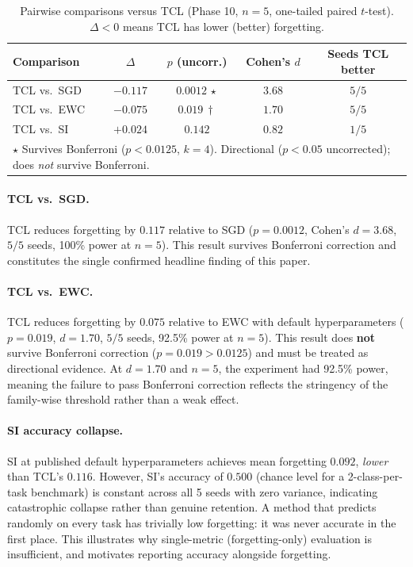 \documentclass[10pt,letterpaper]{article}
\newcommand{\TCL}{\textsc{TCL}}
\newcommand{\EWC}{\textsc{EWC}}
\newcommand{\SI}{\textsc{SI}}
\newcommand{\SGD}{\textsc{SGD}}
\begin{document}
\begin{table}[t]
  \caption{%
    Pairwise comparisons versus \TCL{} (Phase 10, $n{=}5$, one-tailed paired $t$-test).
    $\Delta < 0$ means \TCL{} has lower (better) forgetting.
  }
  \label{tab:phase10_pairwise}
  \centering
  \small
  \begin{tabular}{lcccc}
    \toprule
    Comparison & $\Delta$ & $p$ (uncorr.) & Cohen's $d$ & Seeds \TCL{} better \\
    \midrule
    \TCL{} vs.\ \SGD{}  & $-0.117$ & $0.0012\,\star$ & $3.68$ & $5/5$ \\
    \TCL{} vs.\ \EWC{}  & $-0.075$ & $0.019\,\dag$  & $1.70$ & $5/5$ \\
    \TCL{} vs.\ \SI{}   & $+0.024$ & $0.142$        & $0.82$ & $1/5$ \\
    \bottomrule
    \multicolumn{5}{l}{%
      \footnotesize
      $\star$ Survives Bonferroni ($p < 0.0125$, $k{=}4$).
      \dag{} Directional ($p < 0.05$ uncorrected); does \emph{not} survive Bonferroni.
    }
  \end{tabular}
\end{table}

\paragraph{TCL vs.\ SGD.}
\TCL{} reduces forgetting by $0.117$ relative to \SGD{}
($p{=}0.0012$, Cohen's $d{=}3.68$, $5/5$ seeds, 100\% power at $n{=}5$).
This result survives Bonferroni correction and constitutes the single confirmed
headline finding of this paper.

\paragraph{TCL vs.\ EWC.}
\TCL{} reduces forgetting by $0.075$ relative to \EWC{} with default
hyperparameters ($p{=}0.019$, $d{=}1.70$, $5/5$ seeds, 92.5\% power at $n{=}5$).
This result does \textbf{not} survive Bonferroni correction ($p{=}0.019 > 0.0125$)
and must be treated as directional evidence.
At $d{=}1.70$ and $n{=}5$, the experiment had 92.5\% power, meaning the failure
to pass Bonferroni correction reflects the stringency of the family-wise threshold
rather than a weak effect.

\paragraph{SI accuracy collapse.}
\SI{} at published default hyperparameters achieves mean forgetting $0.092$,
\emph{lower} than \TCL{}'s $0.116$.
However, \SI{}'s accuracy of $0.500$ (chance level for a 2-class-per-task
benchmark) is constant across all 5 seeds with zero variance, indicating
catastrophic collapse rather than genuine retention.
A method that predicts randomly on every task has trivially low forgetting:
it was never accurate in the first place.
This illustrates why single-metric (forgetting-only) evaluation is insufficient,
and motivates reporting accuracy alongside forgetting.
\end{document}
